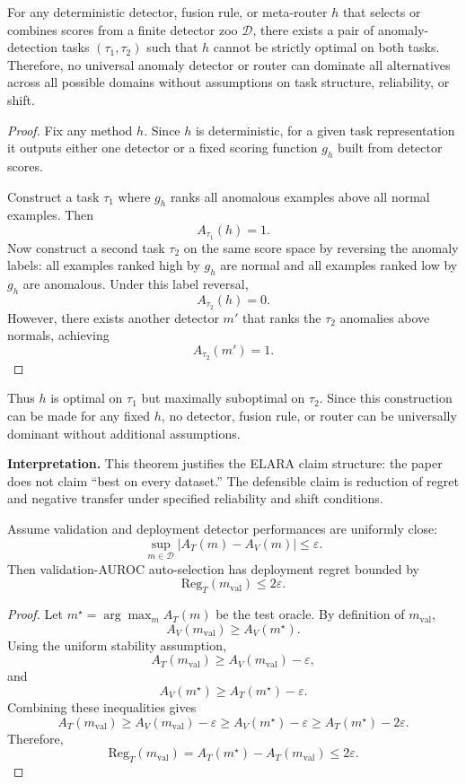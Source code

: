 \begin{theorem}
\label{thm:universal_dominance}
For any deterministic detector, fusion rule, or meta-router $h$ that selects or combines scores from a finite detector zoo $\mathcal{D}$, there exists a pair of anomaly-detection tasks $(\tau_1,\tau_2)$ such that $h$ cannot be strictly optimal on both tasks. Therefore, no universal anomaly detector or router can dominate all alternatives across all possible domains without assumptions on task structure, reliability, or shift.
\end{theorem}
\begin{proof}
Fix any method $h$. Since $h$ is deterministic, for a given task representation it outputs either one detector or a fixed scoring function $g_h$ built from detector scores.

Construct a task $\tau_1$ where $g_h$ ranks all anomalous examples above all normal examples. Then
\[
A_{\tau_1}(h)=1.
\]
Now construct a second task $\tau_2$ on the same score space by reversing the anomaly labels: all examples ranked high by $g_h$ are normal and all examples ranked low by $g_h$ are anomalous. Under this label reversal,
\[
A_{\tau_2}(h)=0.
\]
However, there exists another detector $m'$ that ranks the $\tau_2$ anomalies above normals, achieving
\[
A_{\tau_2}(m')=1.
\]
\end{proof}
Thus $h$ is optimal on $\tau_1$ but maximally suboptimal on $\tau_2$. Since this construction can be made for any fixed $h$, no detector, fusion rule, or router can be universally dominant without additional assumptions.

\medskip
\noindent\textbf{Interpretation.}
This theorem justifies the ELARA claim structure: the paper does not claim ``best on every dataset.'' The defensible claim is reduction of regret and negative transfer under specified reliability and shift conditions.

\begin{theorem}
\label{thm:stable_transfer}
Assume validation and deployment detector performances are uniformly close:
\[
\sup_{m\in\mathcal{D}} |A_T(m)-A_V(m)| \leq \varepsilon.
\]
Then validation-AUROC auto-selection has deployment regret bounded by
\[
\mathrm{Reg}_T(m_{\mathrm{val}}) \leq 2\varepsilon.
\]
\end{theorem}
\begin{proof}
Let $m^\star=\arg\max_{m}A_T(m)$ be the test oracle. By definition of $m_{\mathrm{val}}$,
\[
A_V(m_{\mathrm{val}})\geq A_V(m^\star).
\]
Using the uniform stability assumption,
\[
A_T(m_{\mathrm{val}})\geq A_V(m_{\mathrm{val}})-\varepsilon,
\]
and
\[
A_V(m^\star)\geq A_T(m^\star)-\varepsilon.
\]
Combining these inequalities gives
\[
A_T(m_{\mathrm{val}})
\geq A_V(m_{\mathrm{val}})-\varepsilon
\geq A_V(m^\star)-\varepsilon
\geq A_T(m^\star)-2\varepsilon.
\]
Therefore,
\[
\mathrm{Reg}_T(m_{\mathrm{val}}) = A_T(m^\star)-A_T(m_{\mathrm{val}}) \leq 2\varepsilon.
\]
\end{proof}


